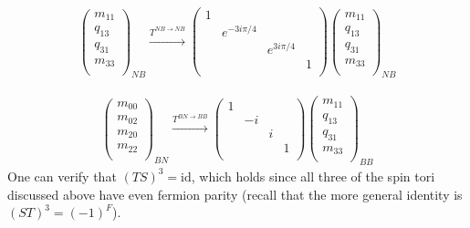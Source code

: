 \begin{align}
\left( \begin{matrix}
m_{11}\\
q_{13}\\
q_{31}\\
m_{33}\\
\end{matrix} \right)_{NB}
\xrightarrow{T^{NB \rightarrow NB}}
 \left( \begin{matrix}
 1&&&\\
&e^{-3 i \pi /4}&&\\
&&e^{3 i \pi /4}&\\
&&&1\\
\end{matrix} \right)
\left( \begin{matrix}
m_{11}\\
q_{13}\\
q_{31}\\
m_{33}\\
\end{matrix} \right)_{NB}
\end{align}

\begin{align}
\left( \begin{matrix}
m_{00}\\
m_{02}\\
m_{20}\\
m_{22}\\
\end{matrix} \right)_{BN}
\xrightarrow{T^{BN \rightarrow BB}}
\left( \begin{matrix}
1&&&\\
&-i&&\\
&&i&\\
&&&1\\
\end{matrix} \right)
\left( \begin{matrix}
m_{11}\\
q_{13}\\
q_{31}\\
m_{33}\\
\end{matrix} \right)_{BB}
\end{align}
One can verify that $(TS)^3 = \text{id}$, which holds since all three of the spin tori discussed above have 
 even fermion parity (recall that the more general identity is $(ST)^3 = (-1)^F$). 

